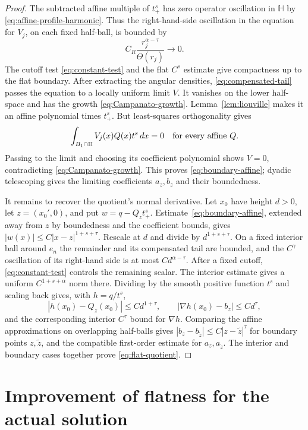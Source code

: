 \documentclass[11pt]{article}
\numberwithin{equation}{section}
\newcommand{\Hh}{\mathbb H}
\begin{document}
\begin{proof}
The subtracted affine multiple of $t_+^s$ has zero operator oscillation in
$\Hh$ by \eqref{eq:affine-profile-harmonic}. Thus the right-hand-side
oscillation in the equation for $V_j$, on each fixed half-ball, is bounded by
\[
                C_R\frac{r_j^{\alpha-\tau}}{\Theta(r_j)}\longrightarrow0.
\]
The cutoff test \eqref{eq:constant-test} and the flat $C^s$ estimate give
compactness up to the flat boundary. After extracting the angular densities,
\eqref{eq:compensated-tail} passes the equation to a locally uniform limit
$V$. It vanishes on the lower half-space and has the growth
\eqref{eq:Campanato-growth}. Lemma~\ref{lem:liouville} makes it an affine
polynomial times $t_+^s$. But least-squares orthogonality gives
\[
       \int_{B_1\cap\Hh}V_j(x)Q(x)t^s\,dx=0
                 \quad\hbox{for every affine }Q.
\]
Passing to the limit and choosing its coefficient polynomial shows $V=0$,
contradicting \eqref{eq:Campanato-growth}. This proves
\eqref{eq:boundary-affine}; dyadic telescoping gives the limiting
coefficients $a_z,b_z$ and their boundedness.

It remains to recover the quotient's normal derivative. Let $x_0$ have
height $d>0$, let $z=(x_0',0)$, and put $w=q-Q_z t_+^s$.
Estimate~\eqref{eq:boundary-affine}, extended away from $z$ by boundedness
and the coefficient bounds, gives
$|w(x)|\leq C|x-z|^{1+s+\tau}$.
Rescale at $d$ and divide by $d^{1+s+\tau}$. On a fixed interior ball
around $e_n$ the remainder and its compensated tail are bounded, and the
$C^\gamma$ oscillation of its right-hand side is at most
$Cd^{\alpha-\tau}$. After a fixed cutoff, \eqref{eq:constant-test} controls
the remaining scalar. The interior estimate gives a uniform
$C^{1+s+\alpha}$ norm there. Dividing by the smooth positive function
$t^s$ and scaling back gives, with $h=q/t^s$,
\[
 |h(x_0)-Q_z(x_0)|\leq Cd^{1+\tau},\qquad
 |\nabla h(x_0)-b_z|\leq Cd^\tau,
\]
and the corresponding interior $C^\tau$ bound for $\nabla h$.
Comparing the affine approximations on overlapping half-balls gives
$|b_z-b_{\widetilde z}|\leq C|z-\widetilde z|^\tau$ for boundary points
$z,\widetilde z$, and the compatible first-order estimate for
$a_z,a_{\widetilde z}$. The interior and boundary cases together prove
\eqref{eq:flat-quotient}.
\end{proof}

\section{Improvement of flatness for the actual solution}\label{sec:flatness}
\end{document}
